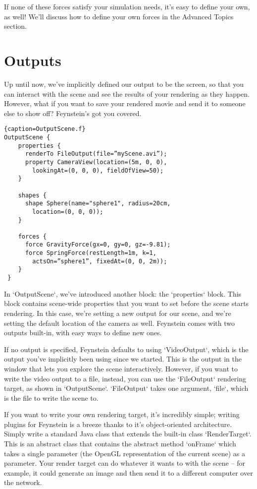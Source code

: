 \documentclass[letterpaper]{article}
\begin{document}
If none of these forces satisfy your simulation needs, it's easy to
define your own, as well! We'll discuss how to define your own forces
in the Advanced Topics section.

\newpage
\section{Outputs}

Up until now, we've implicitly defined our output to be the
screen, so that you can interact with the scene and see the results of
your rendering as they happen. However, what if you want to save your
rendered movie and send it to someone else to show off?  Feynstein's
got you covered.

\begin{lstlisting}{caption=OutputScene.f}
OutputScene {
    properties {
      renderTo FileOutput(file=”myScene.avi”);
      property CameraView(location=(5m, 0, 0), 
        lookingAt=(0, 0, 0), fieldOfView=50);
    }

    shapes {
      shape Sphere(name="sphere1", radius=20cm, 
        location=(0, 0, 0));
    }

    forces {
      force GravityForce(gx=0, gy=0, gz=-9.81);
      force SpringForce(restLength=1m, k=1, 
        actsOn=”sphere1”, fixedAt=(0, 0, 2m));
    }
 }
\end{lstlisting}

In `OutputScene`, we've introduced another block: the `properties`
block. This block contains scene-wide properties that you want to set
before the scene starts rendering. In this case, we're setting a new
output for our scene, and we're setting the default location of the
camera as well. Feynstein comes with two outputs built-in, with easy
ways to define new ones.

If no output is specified, Feynstein defaults to using `VideoOutput`,
which is the output you've implicitly been using since we
started. This is the output in the window that lets you explore the
scene interactively. However, if you want to write the video output to
a file, instead, you can use the `FileOutput` rendering target, as
shown in `OutputScene`. `FileOutput` takes one argument, `file`, which
is the file to write the scene to.

If you want to write your own rendering target, it's incredibly
simple; writing plugins for Feynstein is a breeze thanks to it's
object-oriented architecture. Simply write a standard Java class that
extends the built-in class `RenderTarget`. This is an abstract class
that contains the abstract method `onFrame` which takes a single
parameter (the OpenGL representation of the current scene) as a
parameter. Your render target can do whatever it wants to with the
scene -- for example, it could generate an image and then send it to a
different computer over the network.
\end{document}
